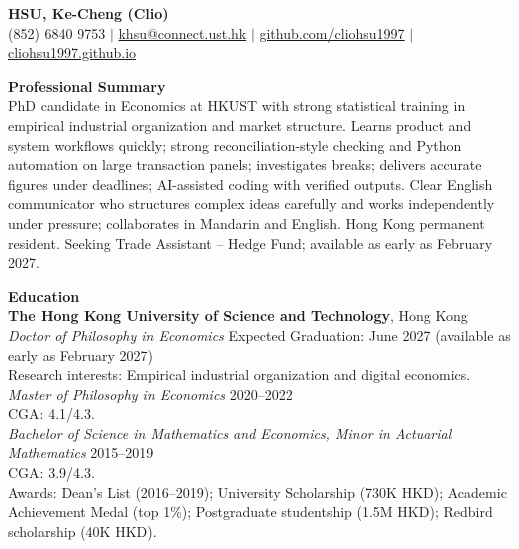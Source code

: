 \documentclass[11pt,letterpaper]{article}
\begin{document}
{\Large \textbf{HSU, Ke-Cheng (Clio)}}\\[1pt]
(852) 6840 9753 \quad $|$ \quad \href{mailto:khsu@connect.ust.hk}{khsu@connect.ust.hk} \quad $|$ \quad \href{https://github.com/cliohsu1997}{github.com/cliohsu1997} \quad $|$ \quad \href{https://cliohsu1997.github.io/}{cliohsu1997.github.io}

\vspace{0.15pt}

{\large \textbf{Professional Summary}}\\[-0.5pt]
PhD candidate in Economics at HKUST with strong statistical training in empirical industrial organization and market structure. Learns product and system workflows quickly; strong reconciliation-style checking and Python automation on large transaction panels; investigates breaks; delivers accurate figures under deadlines; AI-assisted coding with verified outputs. Clear English communicator who structures complex ideas carefully and works independently under pressure; collaborates in Mandarin and English. Hong Kong permanent resident. Seeking Trade Assistant -- Hedge Fund; available as early as February 2027.

\vspace{0.15pt}

{\large \textbf{Education}}\\[-0.5pt]
\textbf{The Hong Kong University of Science and Technology}, Hong Kong\\
\textit{Doctor of Philosophy in Economics} \hfill Expected Graduation: June 2027 (available as early as February 2027)\\
Research interests: Empirical industrial organization and digital economics.\\
\textit{Master of Philosophy in Economics} \hfill 2020--2022\\
CGA: 4.1/4.3.\\
\textit{Bachelor of Science in Mathematics and Economics, Minor in Actuarial Mathematics} \hfill 2015--2019\\
CGA: 3.9/4.3.\\
Awards: Dean's List (2016--2019); University Scholarship (730K HKD); Academic Achievement Medal (top 1\%); Postgraduate studentship (1.5M HKD); Redbird scholarship (40K HKD).

\vspace{0.15pt}
\end{document}

